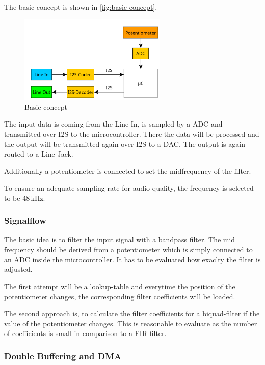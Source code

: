 The basic concept is shown in \autoref{fig:basic-concept}.

\begin{figure}[!h]
    \centering
    \includegraphics[width=7cm]{img/basic_concept.PNG}
    \caption{Basic concept}
    \label{fig:basic-concept}
\end{figure}

The input data is coming from the Line In, is sampled by a \ac{ADC} and transmitted
over \ac{I2S} to the microcontroller. There the data will be processed and the output will be transmitted
again over \ac{I2S} to a \ac{DAC}. The output is again routed to a Line Jack.

Additionally a potentiometer is connected to set the midfrequency of the filter.

To ensure an adequate sampling rate for audio quality, the frequency is selected to be 48\,kHz.

\subsubsection{Signalflow}

The basic idea is to filter the input signal with a bandpass filter. The mid frequency should be derived
from a potentiometer which is simply connected to an \ac{ADC} inside the microcontroller. It has to be evaluated
how exaclty the filter is adjusted.

The first attempt will be a lookup-table and everytime the position of the
potentiometer changes, the corresponding filter coefficients will be loaded.

The second approach is, to calculate the filter coefficients for a biquad-filter if the value of the potentiometer changes.
This is reasonable to evaluate as the number of coefficients is small in comparison to a \ac{FIR}-filter.

\subsubsection{Double Buffering and DMA}

